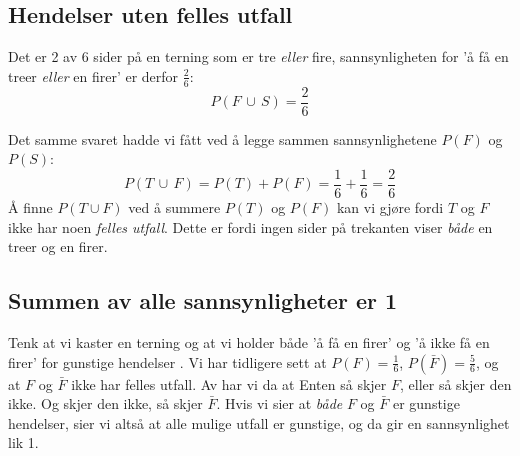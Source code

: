 \subsection{Hendelser uten felles utfall} \vspace{-5pt}
 \qquad
{}
Det er 2 av 6 sider på en terning som er tre \textsl{eller} fire, sannsynligheten for 'å få en treer \textsl{eller} en firer' er derfor $ \frac{2}{6} $:
\[ P(F\,\cup\,S)=\frac{2}{6} \]

Det samme svaret hadde vi fått ved å legge sammen sannsynlighetene $P(F)$ og $P(S)$:
\[ P(T\,\cup\,F)=P(T)+P(F)=\frac{1}{6}+\frac{1}{6}=\frac{2}{6} \]
Å finne $ P(T\cup F) $ ved å summere $ P(T) $ og $ P(F) $ kan vi gjøre fordi $ T $ og $ F $ ikke har noen \textit{felles utfall}. Dette er fordi ingen sider på trekanten viser \textsl{både} en treer og en firer. \regv

\newpage
{}
\newpage
\subsection{Summen av alle sannsynligheter er 1}
Tenk at vi kaster en terning og at vi holder både 'å få en firer' og 'å ikke få en firer' for gunstige hendelser . Vi har tidligere sett at $ {P(F)=\frac{1}{6}} $, $ {P(\bar{F})=\frac{5}{6} }$, og at $ F $ og $ \bar{F} $ ikke har felles utfall. Av  har vi da at
Enten så skjer $ F $, eller så skjer den ikke. Og skjer den ikke, så skjer $ \bar{F} $. Hvis vi sier at \textsl{både} $ F $ og $ \bar{F} $ er gunstige hendelser, sier vi altså at alle mulige utfall er gunstige, og da gir   en sannsynlighet lik 1. \regv
 

